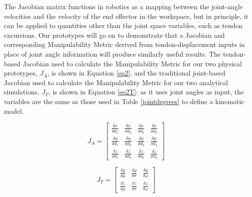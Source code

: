 \documentclass[journal]{IEEEtran}
\begin{document}
The Jacobian matrix functions in robotics as a mapping between the joint-angle velocities and the velocity of the end effector in the workspace, but in principle, it can be applied to quantities other than the joint space variables, such as tendon excursions. Our prototypes will go on to demonstrate that a Jacobian and corresponding Manipulability Metric derived from tendon-displacement inputs in place of joint angle information will produce similarly useful results. The tendon-based Jacobian used to calculate the Manipulability Metric for our two physical prototypes, $J_{A}$, is shown in Equation \ref{eq2}, and the traditional joint-based Jacobian used to calculate the Manipulability Metric for our two analytical simulations, $J_{T}$, is shown in Equation \ref{eq2T}: as it uses joint angles as input, the variables are the same as those used in Table \ref{jointdegrees} to define a kinematic model.

\begin{equation} 
J_{A} = \begin{bmatrix}

\frac{\delta x}{\delta d_{1}} & \frac{\delta x}{\delta d_{2}} & \frac{\delta x}{\delta d_{3}} & \frac{\delta x}{\delta d_{4}} \\ 

\frac{\delta y}{\delta d_{1}} & \frac{\delta y}{\delta d_{2}} & \frac{\delta y}{\delta d_{3}} & \frac{\delta y}{\delta d_{4}} \\ 

\frac{\delta z}{\delta d_{1}} & \frac{\delta z}{\delta d_{2}} & \frac{\delta z}{\delta d_{3}} & \frac{\delta z}{\delta d_{4}}
 
\end{bmatrix} 
\label{eq2}
\end{equation}

\begin{equation} 
J_{T} = \begin{bmatrix}

\frac{\delta y}{\delta \mu} & \frac{\delta y}{\delta \sigma} & \frac{\delta y}{\delta \omega} \\ 
\frac{\delta z}{\delta \mu} & \frac{\delta z}{\delta \sigma} & \frac{\delta z}{\delta \omega} 
 
\end{bmatrix} 
\label{eq2T}
\end{equation}
\end{document}
